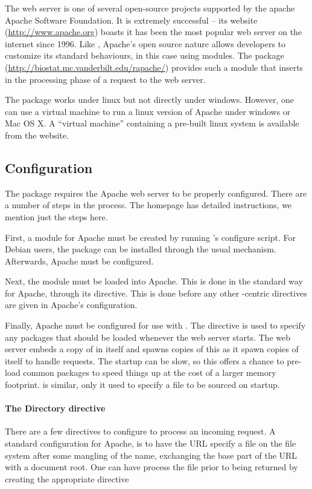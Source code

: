 The  web server is one of several open-source projects
supported by the apache Apache Software Foundation. It is extremely
successful -- its website (\url{http://www.apache.org}) boasts it has
been the most popular web server on the internet since 1996. Like \R,
Apache's open source nature allows developers to customize its
standard behaviours, in this case using modules. The 
package (\url{http://biostat.mc.vanderbilt.edu/rapache/}) provides
such a module that inserts \R\/ in the processing phase of a request
to the web server.

The  package works under linux but not directly under
windows. However, one can use a virtual machine to run a linux version
of Apache under windows or Mac OS X. A ``virtual machine'' containing
a pre-built linux system is available from the  website.

\subsection{Configuration}
\label{sec:configuration}

The  package requires the Apache web server to be
properly configured. There are a number of steps in the process.
The  homepage has detailed instructions, we mention just
the steps here.

First, a module for Apache must be created by running 's
configure script. For Debian users, the package can be installed
through the usual mechanism.
Afterwards, Apache must be configured.

Next, the module must be loaded into Apache. This is done in the
standard way for Apache, through its  directive. This
is done before any other \R-centric directives are given in Apache's configuration.

Finally, Apache must be configured for use with . 
The  directive is used to specify any packages
that should be loaded whenever the web server starts. The web server
embeds a copy of \R\/ in itself and spawns copies of this as it spawn
copies of itself to handle requests. The startup can be slow, so this
offers a chance to pre-load common packages to speed things up at the
cost of a larger memory footprint.  is similar,
only it used to specify a file to be sourced on startup.

\paragraph{The Directory directive}
There are a few directives to configure  to process an
incoming request. A standard configuration for Apache, is to have the
URL specify a file on the file system after some mangling of the name,
exchanging the base part of the URL with a document root. One can have
 process the file prior to being returned by creating the
appropriate directive

